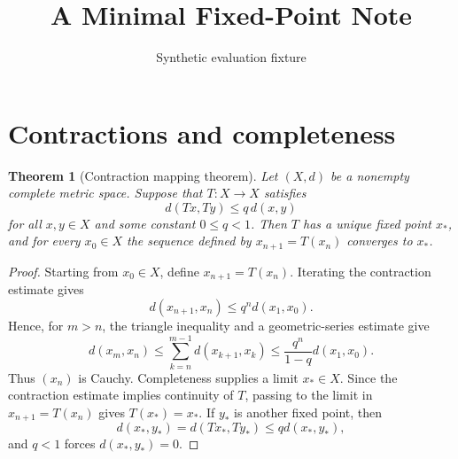 \documentclass{article}
\title{A Minimal Fixed-Point Note}
\author{Synthetic evaluation fixture}
\date{}
\newtheorem{theorem}{Theorem}
\begin{document}
\maketitle

\section{Contractions and completeness}

\begin{theorem}[Contraction mapping theorem]\label{th:contraction}
Let $(X,d)$ be a nonempty complete metric space. Suppose that $T:X\to X$ satisfies
\[
  d(Tx,Ty)\leq q\,d(x,y)
\]
for all $x,y\in X$ and some constant $0\leq q<1$. Then $T$ has a unique fixed point $x_*$, and for every $x_0\in X$ the sequence defined by $x_{n+1}=T(x_n)$ converges to $x_*$.
\end{theorem}

\begin{proof}
Starting from $x_0\in X$, define $x_{n+1}=T(x_n)$. Iterating the contraction estimate gives
\[
  d(x_{n+1},x_n)\leq q^n d(x_1,x_0).
\]
Hence, for $m>n$, the triangle inequality and a geometric-series estimate give
\[
  d(x_m,x_n)
  \leq \sum_{k=n}^{m-1}d(x_{k+1},x_k)
  \leq \frac{q^n}{1-q}d(x_1,x_0).
\]
Thus $(x_n)$ is Cauchy. Completeness supplies a limit $x_*\in X$. Since the contraction estimate implies continuity of $T$, passing to the limit in $x_{n+1}=T(x_n)$ gives $T(x_*)=x_*$. If $y_*$ is another fixed point, then
\[
  d(x_*,y_*)=d(Tx_*,Ty_*)\leq qd(x_*,y_*),
\]
and $q<1$ forces $d(x_*,y_*)=0$.
\end{proof}
\end{document}
